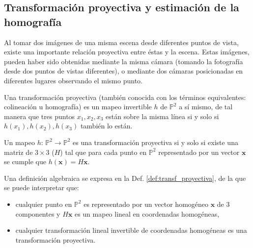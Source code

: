 \subsection{Transformación proyectiva y estimación de la homografía}
\label{sec:transf_proyectiva_homograph}
Al tomar dos imágenes de una misma escena desde diferentes puntos de vista, existe una importante relación proyectiva entre éstas y la escena. Estas imágenes, pueden haber sido obtenidas mediante la misma cámara (tomando la fotografía desde dos puntos de vistas diferentes), o mediante dos cámaras posicionadas en diferentes lugares observando el mismo punto.

Una transformación proyectiva (también conocida con los términos equivalentes: colineación u homografía) es un mapeo invertible $h$ de $\mathbb{P}^2$ a sí mismo, de tal manera que tres puntos $x_1, x_2, x_3$ están sobre la misma línea si y solo si $h(x_1), h(x_2), h(x_3)$ también lo están. 
\begin{def_transf_proyectiva}
\label{def:transf_proyectiva}
Un mapeo $h$: $\mathbb{P}^2 \rightarrow \mathbb{P}^2$ es
  una transformación proyectiva si y solo si existe una matriz de $3 \times 3$ ($\textit{H}$) tal que para cada punto en $\mathbb{P}^2$ representado por un vector $\mathbf{x}$ se cumple que $h(\mathbf{x})=\textit{H}\mathbf{x}$.
\end{def_transf_proyectiva}
Una definición algebraica se expresa en la Def. \ref{def:transf_proyectiva}, de la que se puede interpretar que:
\begin{itemize}
 \item cualquier punto en $\mathbb{P}^2$ es representado por un vector homogéneo $\mathbf{x}$ de 3 componentes y $\textit{H}\mathbf{x}$ es un mapeo lineal en coordenadas homogéneas,
 \item cualquier transformación lineal invertible de coordenadas homogéneas es una transformación proyectiva.
\end{itemize}

